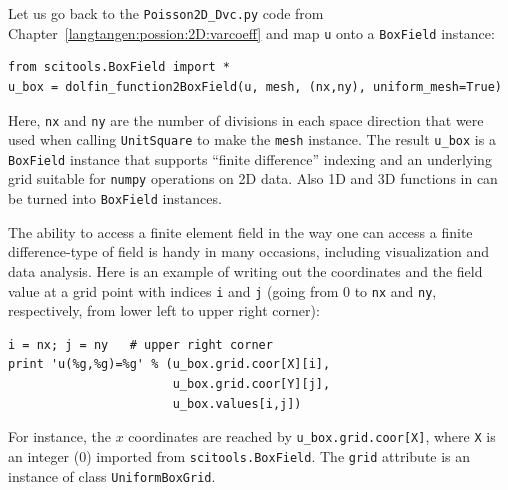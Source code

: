 Let us go back to the {\fontsize{12pt}{12pt}\verb!Poisson2D_Dvc.py!} code from
Chapter~\ref{langtangen:possion:2D:varcoeff} and map {\fontsize{12pt}{12pt}\texttt{u}} onto a
{\fontsize{12pt}{12pt}\texttt{BoxField}} instance:
\begin{Verbatim}[fontsize=\fontsize{10pt}{10pt},tabsize=8,baselinestretch=1.05,
fontfamily=tt,xleftmargin=7mm]
from scitools.BoxField import *
u_box = dolfin_function2BoxField(u, mesh, (nx,ny), uniform_mesh=True)
\end{Verbatim}
\noindent
Here, {\fontsize{12pt}{12pt}\texttt{nx}} and {\fontsize{12pt}{12pt}\texttt{ny}} are the number of divisions in each space
direction that were used when calling {\fontsize{12pt}{12pt}\texttt{UnitSquare}} to make the
{\fontsize{12pt}{12pt}\texttt{mesh}} instance.
The result {\fontsize{12pt}{12pt}\verb!u_box!} is a {\fontsize{12pt}{12pt}\texttt{BoxField}}
instance that supports ``finite difference'' indexing and an underlying
grid suitable for {\fontsize{12pt}{12pt}\texttt{numpy}} operations on 2D data.
Also 1D and 3D functions in \dolfin{} can be turned
into {\fontsize{12pt}{12pt}\texttt{BoxField}} instances.

The ability to access a finite element field in the way one can access
a finite difference-type of field is handy in many occasions, including
visualization and data analysis.
Here is an example of writing out the coordinates and the field value
at a grid point with indices {\fontsize{12pt}{12pt}\texttt{i}} and {\fontsize{12pt}{12pt}\texttt{j}} (going from 0 to
{\fontsize{12pt}{12pt}\texttt{nx}} and {\fontsize{12pt}{12pt}\texttt{ny}}, respectively, from lower left to upper right corner):
\begin{Verbatim}[fontsize=\fontsize{10pt}{10pt},tabsize=8,baselinestretch=1.05,
fontfamily=tt,xleftmargin=7mm]
i = nx; j = ny   # upper right corner
print 'u(%g,%g)=%g' % (u_box.grid.coor[X][i],
                       u_box.grid.coor[Y][j],
                       u_box.values[i,j])
\end{Verbatim}
\noindent
For instance,
the $x$ coordinates are reached by {\fontsize{12pt}{12pt}\verb!u_box.grid.coor[X]!}, where
{\fontsize{12pt}{12pt}\texttt{X}} is an integer (0) imported from {\fontsize{12pt}{12pt}\texttt{scitools.BoxField}}.
The {\fontsize{12pt}{12pt}\texttt{grid}} attribute is an instance of class {\fontsize{12pt}{12pt}\texttt{UniformBoxGrid}}.

